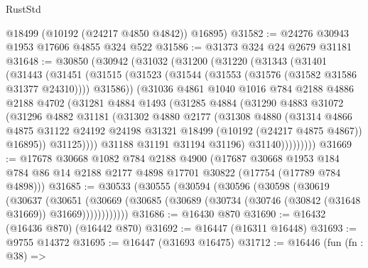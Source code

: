 \begin{lexlean}{RustStd}
\begin{coremodule}
      @18499
      (@10192 (@24217 @4850 @4842))
      @16895)
@31582 := @24276 @30943 @1953 @17606 @4855 @324 @522
@31586 := @31373 @324 @24 @2679 @31181
@31648 := @30850
    (@30942
      (@31032
        (@31200
          (@31220
            (@31343
              (@31401
                (@31443
                  (@31451
                    (@31515
                      (@31523 (@31544 (@31553 (@31576 (@31582 @31586 @31377 @24310)))) @31586))
                    (@31036
                      @4861
                      @1040
                      @1016
                      @784
                      @2188
                      @4886
                      @2188
                      @4702
                      (@31281
                        @4884
                        @1493
                        (@31285
                          @4884
                          (@31290
                            @4883
                            @31072
                            (@31296
                              @4882
                              @31181
                              (@31302
                                @4880
                                @2177
                                (@31308
                                  @4880
                                  (@31314
                                    @4866
                                    @4875
                                    @31122
                                    @24192
                                    @24198
                                    @31321
                                    @18499
                                    (@10192 (@24217 @4875 @4867))
                                    @16895))
                                @31125))))
                        @31188
                        @31191
                        @31194
                        @31196)
                      @31140)))))))))
@31669 := @17678
    @30668
    @1082
    @784
    @2188
    @4900
    (@17687
      @30668
      @1953
      @184
      @784
      @86
      @14
      @2188
      @2177
      @4898
      @17701
      @30822
      (@17754 (@17789 @784 @4898)))
@31685 := @30533
    (@30555
      (@30594
        (@30596
          (@30598
            (@30619
              (@30637
                (@30651
                  (@30669
                    (@30685 (@30689 (@30734 (@30746 (@30842 (@31648 @31669)) @31669))))))))))))
@31686 := @16430 @870
@31690 := @16432 (@16436 @870) (@16442 @870)
@31692 := @16447 (@16311 @16448)
@31693 := @9755 @14372
@31695 := @16447 (@31693 @16475)
@31712 := @16446
    (fun (fn : @38) =>

\end{coremodule}
\end{lexlean}
